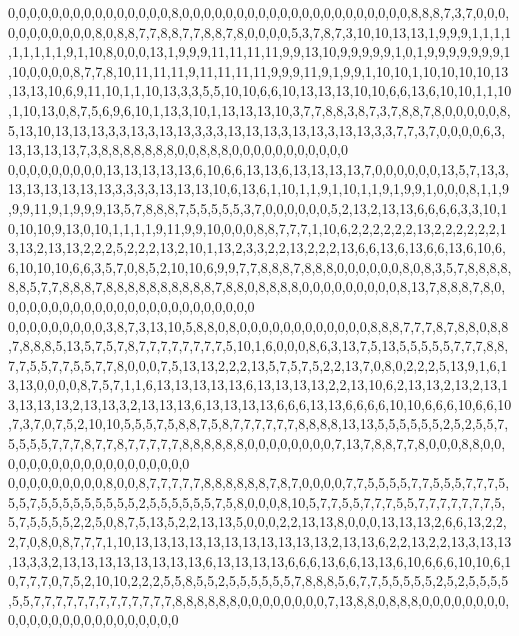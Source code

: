 0,0,0,0,0,0,0,0,0,0,0,0,0,0,0,8,0,0,0,0,0,0,0,0,0,0,0,0,0,0,0,0,0,0,0,0,0,8,8,8,7,3,7,0,0,0,0,0,0,0,0,0,0,0,8,0,8,8,7,7,8,8,7,7,8,8,7,8,0,0,0,0,5,3,7,8,7,3,10,10,13,13,1,9,9,9,1,1,1,1,1,1,1,1,1,9,1,10,8,0,0,0,13,1,9,9,9,11,11,11,11,9,9,13,10,9,9,9,9,9,1,0,1,9,9,9,9,9,9,9,1,10,0,0,0,0,8,7,7,8,10,11,11,11,9,11,11,11,11,9,9,9,11,9,1,9,9,1,10,10,1,10,10,10,10,13,13,13,10,6,9,11,10,1,1,10,13,3,3,5,5,10,10,6,6,10,13,13,13,10,10,6,6,13,6,10,10,1,1,10,1,10,13,0,8,7,5,6,9,6,10,1,13,3,10,1,13,13,13,10,3,7,7,8,8,3,8,7,3,7,8,8,7,8,0,0,0,0,0,8,5,13,10,13,13,13,3,3,13,3,13,13,3,3,3,13,13,13,3,13,13,3,13,13,3,3,7,7,3,7,0,0,0,0,6,3,13,13,13,13,7,3,8,8,8,8,8,8,8,0,0,8,8,8,0,0,0,0,0,0,0,0,0,0,0
0,0,0,0,0,0,0,0,0,13,13,13,13,13,6,10,6,6,13,13,6,13,13,13,13,7,0,0,0,0,0,0,13,5,7,13,3,13,13,13,13,13,13,3,3,3,3,13,13,13,10,6,13,6,1,10,1,1,9,1,10,1,1,9,1,9,9,1,0,0,0,8,1,1,9,9,9,11,9,1,9,9,9,13,5,7,8,8,8,7,5,5,5,5,5,3,7,0,0,0,0,0,0,5,2,13,2,13,13,6,6,6,6,3,3,10,10,10,10,9,13,0,10,1,1,1,1,9,11,9,9,10,0,0,0,8,8,7,7,7,1,10,6,2,2,2,2,2,2,13,2,2,2,2,2,2,13,13,2,13,13,2,2,2,5,2,2,2,13,2,10,1,13,2,3,3,2,2,13,2,2,2,13,6,6,13,6,13,6,6,13,6,10,6,6,10,10,10,6,6,3,5,7,0,8,5,2,10,10,6,9,9,7,7,8,8,8,7,8,8,8,0,0,0,0,0,0,8,0,8,3,5,7,8,8,8,8,8,8,5,7,7,8,8,8,7,8,8,8,8,8,8,8,8,8,8,7,8,8,0,8,8,8,8,0,0,0,0,0,0,0,0,0,8,13,7,8,8,8,7,8,0,0,0,0,0,0,0,0,0,0,0,0,0,0,0,0,0,0,0,0,0,0,0,0
0,0,0,0,0,0,0,0,0,3,8,7,3,13,10,5,8,8,0,8,0,0,0,0,0,0,0,0,0,0,0,0,8,8,8,7,7,7,8,7,8,8,0,8,8,7,8,8,8,5,13,5,7,5,7,8,7,7,7,7,7,7,7,7,5,10,1,6,0,0,0,8,6,3,13,7,5,13,5,5,5,5,5,7,7,7,8,8,7,7,5,5,7,7,5,5,7,7,8,0,0,0,7,5,13,13,2,2,2,13,5,7,5,7,5,2,2,13,7,0,8,0,2,2,2,5,13,9,1,6,13,13,0,0,0,0,8,7,5,7,1,1,6,13,13,13,13,13,6,13,13,13,13,2,2,13,10,6,2,13,13,2,13,2,13,13,13,13,13,2,13,13,3,2,13,13,13,6,13,13,13,13,6,6,6,13,13,6,6,6,6,10,10,6,6,6,10,6,6,10,7,3,7,0,7,5,2,10,10,5,5,5,7,5,8,8,7,5,8,7,7,7,7,7,7,8,8,8,8,13,13,5,5,5,5,5,5,2,5,2,5,5,7,5,5,5,5,7,7,7,8,7,7,8,7,7,7,7,7,8,8,8,8,8,8,0,0,0,0,0,0,0,0,7,13,7,8,8,7,7,8,0,0,0,8,8,0,0,0,0,0,0,0,0,0,0,0,0,0,0,0,0,0,0,0
0,0,0,0,0,0,0,0,0,8,0,0,8,7,7,7,7,7,8,8,8,8,8,8,7,8,7,0,0,0,0,7,7,5,5,5,5,7,7,5,5,5,7,7,7,5,5,5,7,5,5,5,5,5,5,5,5,5,2,5,5,5,5,5,5,7,5,8,0,0,0,8,10,5,7,7,5,5,7,7,7,5,5,7,7,7,7,7,7,7,5,5,7,5,5,5,5,2,2,5,0,8,7,5,13,5,2,2,13,13,5,0,0,0,2,2,13,13,8,0,0,0,13,13,13,2,6,6,13,2,2,2,7,0,8,0,8,7,7,7,1,10,13,13,13,13,13,13,13,13,13,13,13,2,13,13,6,2,2,13,2,2,13,3,13,13,13,3,3,2,13,13,13,13,13,13,13,13,6,13,13,13,13,6,6,6,13,6,6,13,13,6,10,6,6,6,10,10,6,10,7,7,7,0,7,5,2,10,10,2,2,2,5,5,8,5,5,2,5,5,5,5,5,5,7,8,8,8,5,6,7,7,5,5,5,5,5,2,5,2,5,5,5,5,5,5,7,7,7,7,7,7,7,7,7,7,7,7,7,8,8,8,8,8,8,0,0,0,0,0,0,0,0,7,13,8,8,0,8,8,8,0,0,0,0,0,0,0,0,0,0,0,0,0,0,0,0,0,0,0,0,0,0,0,0

